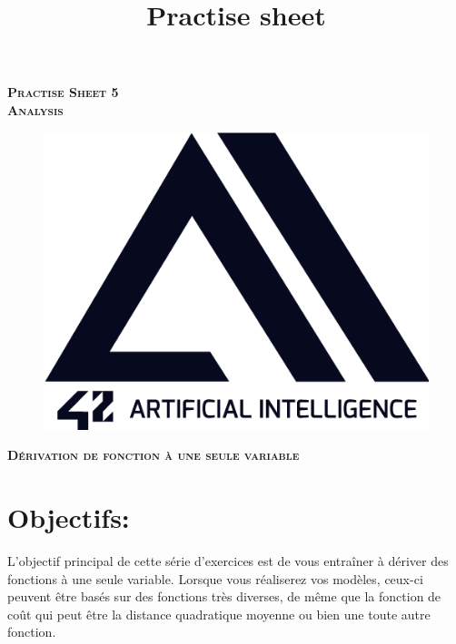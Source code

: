 \documentclass[11pt, french]{article}
\author{} %
\title{Practise sheet}
\begin{document}
\vspace*{2cm}
\begin{center}
    \textsc{\fontsize{40}{48} \bfseries Practise Sheet 5}\\[0.6cm]
    \textsc{\fontsize{40}{48} \bfseries Analysis}\\[0.3cm]
\end{center}
\vspace{3cm}

\begin{figure}[!h]
\center
\includegraphics[scale=0.5]{logo-42-ai.png}
\label{fig:1st_page_logo_42ai}
\end{figure}

\vspace*{2cm}
\begin{center}
    \textsc{\fontsize{32}{48} \bfseries Dérivation de fonction à une seule variable}\\[0.6cm]
\end{center}
\vspace{3cm}

\newpage



\section*{Objectifs:}
L'objectif principal de cette série d'exercices est de vous entraîner à dériver des fonctions à une seule variable.
Lorsque vous réaliserez vos modèles, ceux-ci peuvent être basés sur des fonctions très diverses, de même que la fonction de coût qui peut être la distance quadratique moyenne ou bien une toute autre fonction.
\end{document}

